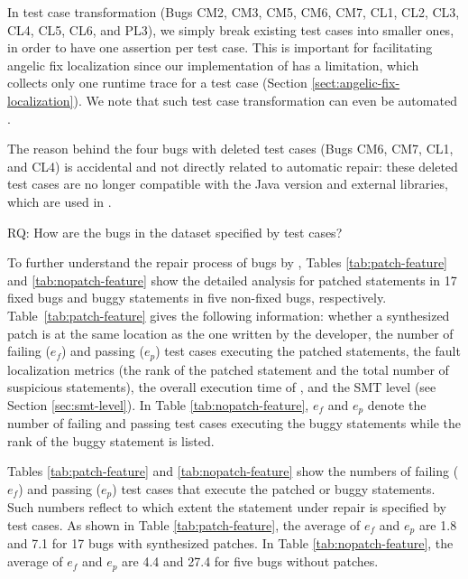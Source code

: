 In test case transformation (Bugs CM2, CM3, CM5, CM6, CM7, CL1, CL2, CL3, CL4, CL5, CL6, and PL3), we simply break existing test cases into smaller ones, in order to have one assertion per test case. This is important for facilitating angelic fix localization since our implementation of \nopol has a limitation, which collects only one runtime trace for a test case (Section \ref{sect:angelic-fix-localization}). We note that such test case transformation can even be automated \cite{brefactoring}. 

The reason behind the four bugs with deleted test cases (Bugs CM6, CM7, CL1, and CL4) is accidental and not directly related to automatic repair: these deleted test cases are no longer compatible with the Java version and external libraries, which are used in \nopol. 

\medskip
\begin{mdframed}
RQ\label{rq-specify}: How are the bugs in the dataset specified by test cases?
\end{mdframed}

To further understand the repair process of bugs by \nopol, Tables \ref{tab:patch-feature} and \ref{tab:nopatch-feature} show the detailed analysis for patched statements in 17 fixed bugs and buggy statements in five non-fixed bugs, respectively. Table~\ref{tab:patch-feature} gives the following information:
whether a synthesized patch is at the same location as the one written by the developer, 
the number of failing ($e_f$) and passing ($e_p$) test cases executing the patched statements,
the fault localization metrics (the rank of the patched statement and the total number of suspicious statements), the overall execution time of \nopol, and the SMT level (see Section \ref{sec:smt-level}).
In Table \ref{tab:nopatch-feature}, $e_f$ and $e_p$ denote the number of failing and passing test cases executing the buggy statements while the rank of the buggy statement is listed. 

Tables \ref{tab:patch-feature} and \ref{tab:nopatch-feature} show the numbers of failing ($e_f$) and passing ($e_p$) test cases that execute the patched or buggy statements. Such numbers reflect to which extent the statement under repair is specified by test cases.
As shown in Table \ref{tab:patch-feature}, the average of $e_f$ and $e_p$ are 1.8 and 7.1 for 17 bugs with synthesized patches. In Table \ref{tab:nopatch-feature}, the average of $e_f$ and $e_p$ are 4.4 and 27.4 for five bugs without patches. 

